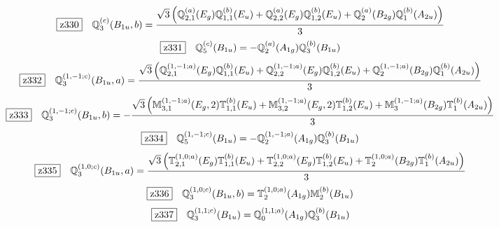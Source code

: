\documentclass[fleqn,10pt,landscape]{jsarticle}
\begin{document}
\begin{dmath*}
\hspace*{3mm}\fbox{z330}\quad \mathbb{Q}_{3}^{(c)}(B_{1u},b)=\frac{\sqrt{3} \left(\mathbb{Q}_{2,1}^{(a)}(E_{g}) \mathbb{Q}_{1,1}^{(b)}(E_{u}) + \mathbb{Q}_{2,2}^{(a)}(E_{g}) \mathbb{Q}_{1,2}^{(b)}(E_{u}) + \mathbb{Q}_{2}^{(a)}(B_{2g}) \mathbb{Q}_{1}^{(b)}(A_{2u})\right)}{3}
\end{dmath*}
\begin{dmath*}
\hspace*{3mm}\fbox{z331}\quad \mathbb{Q}_{5}^{(c)}(B_{1u})=- \mathbb{Q}_{2}^{(a)}(A_{1g}) \mathbb{Q}_{3}^{(b)}(B_{1u})
\end{dmath*}
\begin{dmath*}
\hspace*{3mm}\fbox{z332}\quad \mathbb{Q}_{3}^{(1,-1;c)}(B_{1u},a)=\frac{\sqrt{3} \left(\mathbb{Q}_{2,1}^{(1,-1;a)}(E_{g}) \mathbb{Q}_{1,1}^{(b)}(E_{u}) + \mathbb{Q}_{2,2}^{(1,-1;a)}(E_{g}) \mathbb{Q}_{1,2}^{(b)}(E_{u}) + \mathbb{Q}_{2}^{(1,-1;a)}(B_{2g}) \mathbb{Q}_{1}^{(b)}(A_{2u})\right)}{3}
\end{dmath*}
\begin{dmath*}
\hspace*{3mm}\fbox{z333}\quad \mathbb{Q}_{3}^{(1,-1;c)}(B_{1u},b)=- \frac{\sqrt{3} \left(\mathbb{M}_{3,1}^{(1,-1;a)}(E_{g},2) \mathbb{T}_{1,1}^{(b)}(E_{u}) + \mathbb{M}_{3,2}^{(1,-1;a)}(E_{g},2) \mathbb{T}_{1,2}^{(b)}(E_{u}) + \mathbb{M}_{3}^{(1,-1;a)}(B_{2g}) \mathbb{T}_{1}^{(b)}(A_{2u})\right)}{3}
\end{dmath*}
\begin{dmath*}
\hspace*{3mm}\fbox{z334}\quad \mathbb{Q}_{5}^{(1,-1;c)}(B_{1u})=- \mathbb{Q}_{2}^{(1,-1;a)}(A_{1g}) \mathbb{Q}_{3}^{(b)}(B_{1u})
\end{dmath*}
\begin{dmath*}
\hspace*{3mm}\fbox{z335}\quad \mathbb{Q}_{3}^{(1,0;c)}(B_{1u},a)=\frac{\sqrt{3} \left(\mathbb{T}_{2,1}^{(1,0;a)}(E_{g}) \mathbb{T}_{1,1}^{(b)}(E_{u}) + \mathbb{T}_{2,2}^{(1,0;a)}(E_{g}) \mathbb{T}_{1,2}^{(b)}(E_{u}) + \mathbb{T}_{2}^{(1,0;a)}(B_{2g}) \mathbb{T}_{1}^{(b)}(A_{2u})\right)}{3}
\end{dmath*}
\begin{dmath*}
\hspace*{3mm}\fbox{z336}\quad \mathbb{Q}_{3}^{(1,0;c)}(B_{1u},b)=\mathbb{T}_{2}^{(1,0;a)}(A_{1g}) \mathbb{M}_{2}^{(b)}(B_{1u})
\end{dmath*}
\begin{dmath*}
\hspace*{3mm}\fbox{z337}\quad \mathbb{Q}_{3}^{(1,1;c)}(B_{1u})=\mathbb{Q}_{0}^{(1,1;a)}(A_{1g}) \mathbb{Q}_{3}^{(b)}(B_{1u})
\end{dmath*}
\end{document}
